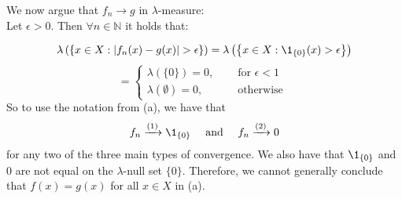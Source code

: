 \documentclass{Class}
\begin{document}
\begin{enumerate}
We now argue that $f_n \rightarrow g$ in $\lambda$-measure:\\Let $\epsilon>0$. Then $\forall n \in \mathbb{N}$ it holds that:

$$
\lambda\left(\left\{x \in X:\left|f_n(x)-g(x)\right|>\epsilon\right\}\right)=\lambda\left(\left\{x \in X: \1_{\{0\}}(x)>\epsilon\right\}\right)$$$$=\begin{cases}
    \lambda(\{0\})=0, \quad& \text{ for }\epsilon<1 \\
\lambda(\emptyset)=0, \quad& \text {    otherwise }
\end{cases}
$$
So to use the notation from (a), we have that $$f_n \xrightarrow{(1)} \1_{\{0\}} \quad \text{ and } \quad f_n \xrightarrow{(2)} 0$$ for any two of the three main types of convergence. We also have that $\1_{\{0\}}$ and 0 are not equal on the $\lambda$-null set $\{0\}$. Therefore, we cannot generally conclude that $f(x)=g(x)$ for all $ x \in X$ in (a).
\end{enumerate}
\end{document}
